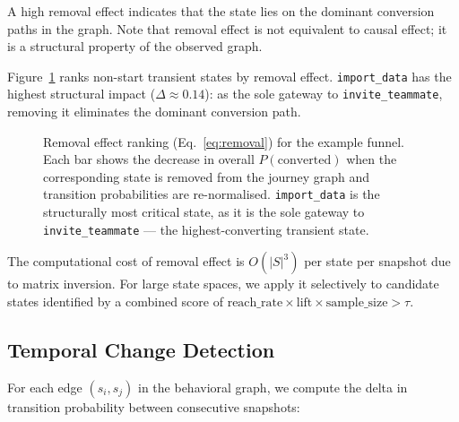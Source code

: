 \documentclass[12pt, a4paper]{article}
\begin{document}
A high removal effect indicates that the state lies on the dominant conversion paths in the graph. Note that removal effect is not equivalent to causal effect; it is a structural property of the observed graph.

Figure~\ref{fig:removal} ranks non-start transient states by removal effect. \texttt{import\_data} has the highest structural impact ($\Delta \approx 0.14$): as the sole gateway to \texttt{invite\_teammate}, removing it eliminates the dominant conversion path.

\begin{figure}[htbp]
\centering
{}
\caption{Removal effect ranking (Eq.~\eqref{eq:removal}) for the example funnel.
Each bar shows the decrease in overall $P(\text{converted})$ when the corresponding
state is removed from the journey graph and transition probabilities are
re-normalised. \texttt{import\_data} is the structurally most critical state,
as it is the sole gateway to \texttt{invite\_teammate} --- the highest-converting
transient state.}
\label{fig:removal}
\end{figure}

The computational cost of removal effect is $O(|S|^3)$ per state per snapshot due to matrix inversion. For large state spaces, we apply it selectively to candidate states identified by a combined score of $\text{reach\_rate} \times \text{lift} \times \text{sample\_size} > \tau$.

\subsection{Temporal Change Detection}

For each edge $(s_i, s_j)$ in the behavioral graph, we compute the delta in transition probability between consecutive snapshots:
\end{document}
